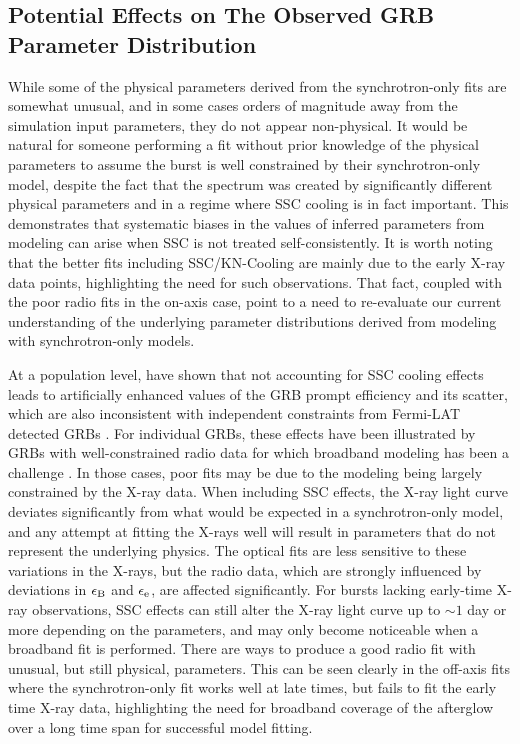 \documentclass[fleqn,usenatbib]{mnras}
\begin{document}
\subsection{Potential Effects on The Observed GRB Parameter Distribution}

While some of the physical parameters derived from the synchrotron-only fits are somewhat unusual, and in some cases orders of magnitude away from the simulation input parameters, they do not appear non-physical. It would be natural for someone performing a fit without prior knowledge of the physical parameters to assume the burst is well constrained by their synchrotron-only model, despite the fact that the spectrum was created by significantly different physical parameters and in a regime where SSC cooling is in fact important. This demonstrates that systematic biases in the values of inferred parameters from modeling can arise when SSC is not treated self-consistently. It is worth noting that the better fits including SSC/KN-Cooling are mainly due to the early X-ray data points, highlighting the need for such observations. That fact, coupled with the poor radio fits in the on-axis case, point to a need to re-evaluate our current understanding of the underlying parameter distributions derived from modeling with synchrotron-only models.

At a population level, \citet{BNP16} have shown that not accounting for SSC cooling effects leads to artificially enhanced values of the GRB prompt efficiency and its scatter, which are also inconsistent with independent constraints from Fermi-LAT detected GRBs \citep{Nava}. For individual GRBs, these effects have been illustrated by GRBs with well-constrained radio data for which broadband modeling has been a challenge \citep{Gv14}. In those cases, poor fits may be due to the modeling being largely constrained by the X-ray data. When including SSC effects, the X-ray light curve deviates significantly from what would be expected in a synchrotron-only model, and any attempt at fitting the X-rays well will result in parameters that do not represent the underlying physics. The optical fits are less sensitive to these variations in the X-rays, but the radio data, which are strongly influenced by deviations in $\epsilon_{\rm B}$ and $\epsilon_{\rm e}$, are affected significantly. For bursts lacking early-time X-ray observations, SSC effects can still alter the X-ray light curve up to $\sim 1$ day or more depending on the parameters, and may only become noticeable when a broadband fit is performed. There are ways to produce a good radio fit with unusual, but still physical, parameters. This can be seen clearly in the off-axis fits where the synchrotron-only fit works well at late times, but fails to fit the early time X-ray data, highlighting the need for broadband coverage of the afterglow over a long time span for successful model fitting.
\end{document}

